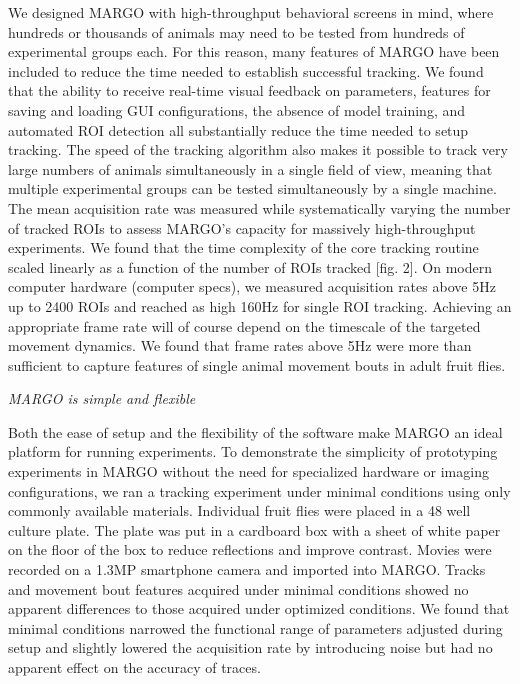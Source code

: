 \documentclass[10pt]{article}
\begin{document}
\begin{multicols}{2}
We designed MARGO with high-throughput behavioral screens in mind, where hundreds or thousands of animals may need to be tested from hundreds of experimental groups each. For this reason, many features of MARGO have been included to reduce the time needed to establish successful tracking. We found that the ability to receive real-time visual feedback on parameters, features for saving and loading GUI configurations, the absence of model training, and automated ROI detection all  substantially reduce the time needed to setup tracking. The speed of the tracking algorithm also makes it possible to track very large numbers of animals simultaneously in a single field of view, meaning that multiple experimental groups can be tested simultaneously by a single machine. The mean acquisition rate was measured while systematically varying the number of tracked ROIs to assess MARGO’s capacity for massively high-throughput experiments. We found that the time complexity of the core tracking routine scaled linearly as a function of the number of ROIs tracked [fig. 2]. On modern computer hardware (computer specs), we measured acquisition rates above 5Hz up to 2400 ROIs and reached as high 160Hz for single ROI tracking. Achieving an appropriate frame rate will of course depend on the timescale of the targeted movement dynamics. We found that frame rates above 5Hz were more than sufficient to capture features of single animal movement bouts in adult fruit flies.

\textit{MARGO is simple and flexible}

Both the ease of setup and the flexibility of the software make MARGO an ideal platform for running experiments. To demonstrate the simplicity of prototyping experiments in MARGO without the need for specialized hardware or imaging configurations, we ran a tracking experiment under minimal conditions using only commonly available materials.  Individual fruit flies were placed in a 48 well culture plate. The plate was put in a cardboard box with a sheet of white paper on the floor of the box to reduce reflections and improve contrast. Movies were recorded on a 1.3MP smartphone camera and imported into MARGO. Tracks and movement bout features acquired under minimal conditions showed no apparent differences to those acquired under optimized conditions. We found that minimal conditions narrowed the functional range of parameters adjusted during setup and slightly lowered the acquisition rate by introducing noise but had no apparent effect on the accuracy of traces.


\end{multicols}
\end{document}

